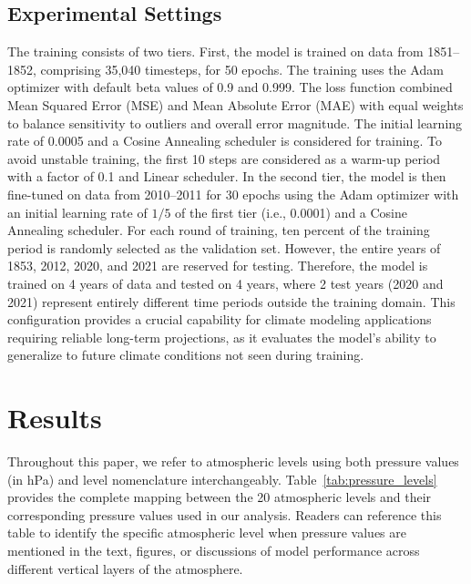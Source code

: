 \documentclass{article}
\begin{document}
    \subsection{Experimental Settings}
        The training consists of two tiers. First, the model is trained on data from 1851--1852, comprising 35,040 timesteps, for 50 epochs. The training uses the Adam optimizer with default beta values of 0.9 and 0.999. The loss function combined Mean Squared Error (MSE) and Mean Absolute Error (MAE) with equal weights to balance sensitivity to outliers and overall error magnitude. The initial learning rate of 0.0005 and a Cosine Annealing scheduler is considered for training. To avoid unstable training, the first 10 steps are considered as a warm-up period with a factor of 0.1 and Linear scheduler. In the second tier, the model is then fine-tuned on data from 2010--2011 for 30 epochs using the Adam optimizer with an initial learning rate of $1/5$ of the first tier (i.e., 0.0001) and a Cosine Annealing scheduler. For each round of training, ten percent of the training period is randomly selected as the validation set. However, the entire years of 1853, 2012, 2020, and 2021 are reserved for testing. Therefore, the model is trained on 4 years of data and tested on 4 years, where 2 test years (2020 and 2021) represent entirely different time periods outside the training domain. This configuration provides a crucial capability for climate modeling applications requiring reliable long-term projections, as it evaluates the model's ability to generalize to future climate conditions not seen during training.

\section{Results} \label{sec:appendix-3}
    Throughout this paper, we refer to atmospheric levels using both pressure values (in hPa) and level nomenclature interchangeably. Table~\ref{tab:pressure_levels} provides the complete mapping between the 20 atmospheric levels and their corresponding pressure values used in our analysis. Readers can reference this table to identify the specific atmospheric level when pressure values are mentioned in the text, figures, or discussions of model performance across different vertical layers of the atmosphere.
\end{document}
